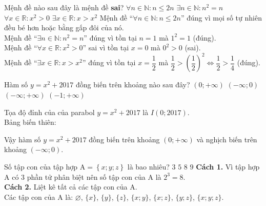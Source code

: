 \begin{ex}%
 Mệnh đề nào sau đây là mệnh đề \textbf{sai}?
 \choice
  {$\forall n \in \mathbb{N}: n \leq 2n$}
  {$\exists n \in \mathbb{N}: n^2 = n$}
  {\True $\forall x \in \mathbb{R}: x^2 > 0$}
  {$\exists x \in \mathbb{R}: x > x^2$}
 \loigiai
 {
 Mệnh đề ``$\forall n \in \mathbb{N}: n \leq 2n$'' đúng vì mọi số tự nhiên đều bé hơn hoặc bằng gấp đôi của nó.\\
 Mệnh đề ``$\exists n \in \mathbb{N}: n^2 = n$'' đúng vì tồn tại $n = 1$ mà $1^2 = 1$ (đúng).\\ 
 Mệnh đề ``$\forall x \in \mathbb{R}: x^2 > 0$'' sai vì tồn tại $x = 0$ mà $0^2 > 0$ (sai).\\
 Mệnh đề ``$\exists x \in \mathbb{R}: x > x^2$'' đúng vì tồn tại $x = \dfrac{1}{2}$ mà $\dfrac{1}{2} > \left(\dfrac{1}{2}\right)^2 \Leftrightarrow \dfrac{1}{2} > \dfrac{1}{4}$ (đúng).
 }
\end{ex}


\begin{ex}%
 Hàm số $y = x^2 + 2017$ đồng biến trên khoảng nào sau đây?
 \choice
  {\True $(0; +\infty)$}
  {$(-\infty; 0)$}
  {$(-\infty; +\infty)$}
  {$(-1;+\infty)$}
 \loigiai
 {
 Tọa độ đỉnh của của parabol $y = x^2 + 2017$ là $I(0;2017)$.\\
 Bảng biến thiên:
 \begin{center}
 \end{center}
 Vậy hàm số $y = x^2 + 2017$ đồng biến trên khoảng $(0; +\infty)$ và nghịch biến trên khoảng $(-\infty;0)$.
 }
\end{ex}


\begin{ex}%
 Số tập con của tập hợp $\mathrm{A} = \left\{x; y; z\right\}$ là bao nhiêu?
 \choice
  {$3$}
  {$5$}
  {\True $8$}
  {$9$}
 \loigiai
 {
 \textbf{Cách 1.} Vì tập hợp $\mathrm{A}$ có $3$ phần tử phân biệt nên số tập con của $\mathrm{A}$ là $2^3 = 8$.\\
 \textbf{Cách 2.} Liệt kê tất cả các tập con của $\mathrm{A}$.\\
 Các tập con của $\mathrm{A}$ là: $\varnothing$, $\{x\}$, $\{y\}$, $\{z\}$, $\{x;y\}$, $\{x;z\}$, $\{y;z\}$, $\{x;y;z\}$.
 }
\end{ex}


